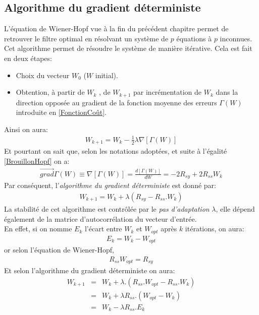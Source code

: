 \subsection{Algorithme du gradient déterministe}
L'équation de Wiener-Hopf vue à la fin du précédent chapitre permet de retrouver le filtre optimal en résolvant un système de $ p $ équations à $ p $ inconnues. Cet algorithme permet de résoudre le système de manière itérative. Cela est fait en deux étapes:
\begin{itemize}
\item Choix du vecteur $ W_{0} $ ($ W $ initial).
\item Obtention, à partir de $ W_{k} $ , de $ W_{k+1} $ par incrémentation de $ W_{k} $ dans la direction opposée au gradient de la fonction moyenne des erreurs $ \Gamma(W) $ introduite en \ref{FonctionCoût}.
\end{itemize}
Ainsi on aura\cite{Esiee}:
\begin{eqnarray}
W_{k+1} = W_{k} - \frac{1}{2}\lambda\nabla [\Gamma(W)]
\end{eqnarray}
Et pourtant on sait que, selon les notations adoptées, et suite à l'égalité \ref{BrouillonHopf} on a:
\begin{eqnarray}
\overrightarrow{grad}\Gamma(W) \equiv \nabla [\Gamma(W)] = \frac{d[\Gamma(W)]}{dW} = -2R_{sy}+2R_{ss}W_{k}
\end{eqnarray}
Par conséquent, l'\emph{algorithme du gradient déterministe} est donné par\cite{ThAlaedine}:
\begin{eqnarray}\label{AlgoGradDéterministe}
W_{k+1} = W_{k} + \lambda( R_{sy} - R_{ss}.W_{k})
\end{eqnarray}
La stabilité de cet algorithme est contrôlée par le \emph{pas d'adaptation} $ \lambda $, elle dépend également de la matrice d'autocorrélation du vecteur d'entrée\cite{ThAlaedine}.\\
En effet, si on nomme $ E_{k} $ l'écart entre $ W_{k} $ et $ W_{opt} $ après $ k $ itérations, on aura:
\begin{eqnarray}
E_{k} = W_{k} - W_{opt}
\end{eqnarray}
or selon l'équation de Wiener-Hopf,
\begin{eqnarray}
R_{ss}W_{opt} = R_{sy}
\end{eqnarray}
Et selon l'algorithme du gradient déterministe on aura:
\begin{eqnarray}
W_{k+1} &=& W_{k} + \lambda .( R_{ss}.W_{opt} - R_{ss}.W_{k})\\
		&=& W_{k} + \lambda R_{ss}.( W_{opt} - W_{k})\\
		&=& W_{k} - \lambda R_{ss}.E_{k}
\end{eqnarray}
